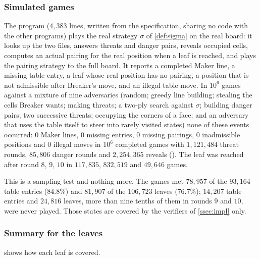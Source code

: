 \subsubsection*{Simulated games}
The program  ($4{,}383$ lines, written from the specification, sharing no code with the
other programs) plays the real strategy $\sigma$ of \cref{def:sigma} on the real board: it looks up the two
files, answers threats and danger pairs, reveals occupied cells, computes an actual pairing for the real
position when a leaf is reached, and plays the pairing strategy to the full board. It reports a completed
Maker line, a missing table entry, a leaf whose real position has no pairing, a position that is not
admissible after Breaker's move, and an illegal table move. In $10^6$ games against a mixture of nine
adversaries (random; greedy line building; stealing the cells Breaker wants; making threats; a two-ply
search against $\sigma$; building danger pairs; two successive threats; occupying the corners of a face;
and an adversary that uses the table itself to steer into rarely visited states) none of these events
occurred: $0$ Maker lines, $0$ missing entries, $0$ missing pairings, $0$ inadmissible positions and $0$
illegal moves in $10^6$ completed games with $1{,}121{,}484$ threat rounds, $85{,}806$ danger rounds and $2{,}254{,}365$ reveals
(). The leaf was reached after round $8$, $9$, $10$ in
$117{,}835$, $832{,}519$ and $49{,}646$ games.

This is a sampling test and nothing more. The games met $78{,}957$ of the $93{,}164$ table entries
($84.8\%$) and $81{,}907$ of the $106{,}723$ leaves ($76.7\%$); $14{,}207$ table entries and $24{,}816$
leaves, more than nine tenths of them in rounds $9$ and $10$, were never played. Those states are
covered by the verifiers of \cref{ssec:impl} only.

\subsubsection*{Summary for the leaves}
 shows how each leaf is covered.

